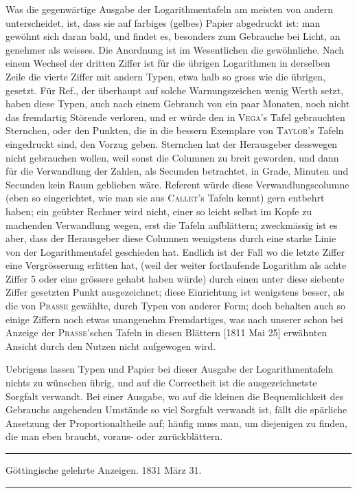 Was die gegenwärtige Ausgabe der Logarithmentafeln am meisten von andern unterscheidet, ist, dass sie auf farbiges (gelbes) Papier abgedruckt ist: man
gewöhnt sich daran bald, und findet es, besonders zum Gebrauche bei Licht, an%
genehmer als weisses. Die Anordnung ist im Wesentlichen die gewöhnliche.
Nach einem Wechsel der dritten Ziffer ist für die übrigen Logarithmen in derselben Zeile die vierte Ziffer mit andern Typen, etwa halb so gross wie die übrigen,
gesetzt. Für Ref., der überhaupt auf solche Warnungszeichen wenig Werth setzt,
haben diese Typen, auch nach einem Gebrauch von ein paar Monaten, noch nicht
das fremdartig Störende verloren, und er würde den in \textsc{Vega}’s Tafel gebrauchten
Sternchen, oder den Punkten, die in die bessern Exemplare von \textsc{Taylor}’s Tafeln
eingedruckt sind, den Vorzug geben. Sternchen hat der Herausgeber desswegen
nicht gebrauchen wollen, weil sonst die Columnen zu breit geworden, und dann
für die Verwandlung der Zahlen, als Secunden betrachtet, in Grade, Minuten
und Secunden kein Raum geblieben wäre. Referent würde diese Verwandlungscolumne (eben so eingerichtet, wie man sie aus \textsc{Callet}’s Tafeln kennt) gern entbehrt haben; ein geübter Rechner wird nicht, einer so leicht selbst im Kopfe zu
machenden Verwandlung wegen, erst die Tafeln aufblättern; zweckmässig ist es
aber, dass der Herausgeber diese Columnen wenigstens durch eine starke Linie
von der Logarithmentafel geschieden hat. Endlich ist der Fall wo die letzte Ziffer eine Vergrösserung erlitten hat, (weil der weiter fortlaufende Logarithm als
achte Ziffer 5 oder eine grössere gehabt haben würde) durch einen unter diese siebente Ziffer gesetzten Punkt ausgezeichnet; diese Einrichtung ist wenigstens besser, als die von \textsc{Prasse} gewählte, durch Typen von anderer Form; doch behalten
auch so einige Ziffern noch etwas unangenehm Fremdartiges, was nach unserer
schon bei Anzeige der \textsc{Prasse}’schen Tafeln in diesen Blättern [1811 Mai 25] erwähnten Ansicht durch den Nutzen nicht aufgewogen wird.

Uebrigens lassen Typen und Papier bei dieser Ausgabe der Logarithmentafeln nichts zu wünschen übrig, und auf die Correctheit ist die ausgezeichnetste
Sorgfalt verwandt. Bei einer Ausgabe, wo auf die kleinen die Bequemlichkeit
des Gebrauchs angehenden Umstände so viel Sorgfalt verwandt ist, fällt die spärliche Ansetzung der Proportionaltheile auf; häufig muss man, um diejenigen zu
finden, die man eben braucht, voraus- oder zurückblättern.
\par{}\begin{center}\rule{0.7\linewidth}{0.4pt}\par Göttingische gelehrte Anzeigen. 1831 März 31.\par\rule{0.7\linewidth}{0.4pt}\end{center}

